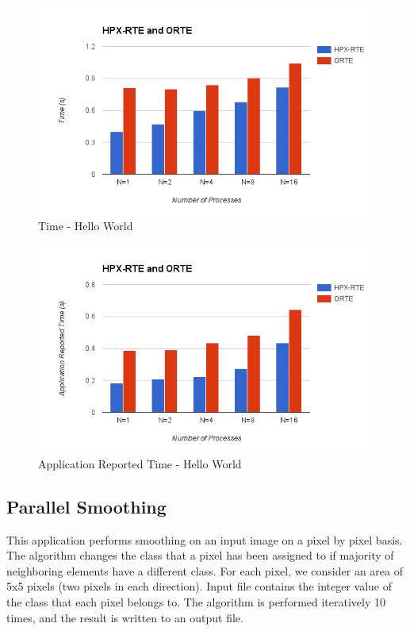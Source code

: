 \begin{figure}[h!]
\centering
\includegraphics[scale=0.7]{images/time-all-hello-world-infiniband.png}
\caption[Time - Hello World]{Time - Hello World}
\label{fig:time-all-hello-world-infiniband}
\end{figure}

\begin{figure}[h!]
\centering
\includegraphics[scale=0.7]{images/time-app-hello-world-infiniband.png}
\caption[Application Reported Time - Hello World]{Application Reported Time - Hello World}
\label{fig:time-app-hello-world-infiniband}
\end{figure}

\clearpage
\subsection{Parallel Smoothing}
This application performs smoothing on an input image on a pixel by pixel basis. The algorithm changes the class that a pixel has been assigned to if majority of neighboring elements have a different class. For each pixel, we consider an area of 5x5 pixels (two pixels in each direction). Input file contains the integer value of the class that each pixel belongs to. The algorithm is performed iteratively 10 times, and the result is written to an output file.

